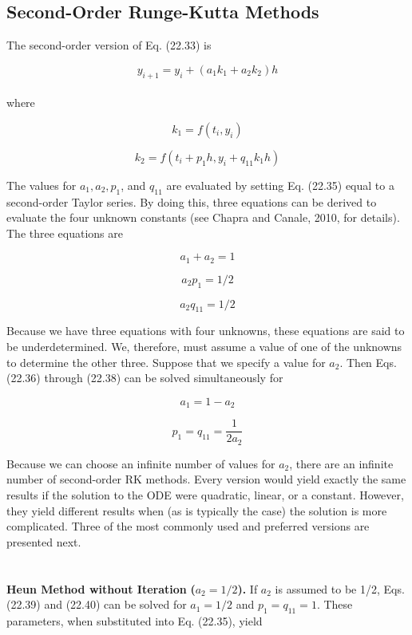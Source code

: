 \documentclass[../main.tex]{subfiles}
\begin{document}
\subsection{Second-Order Runge-Kutta Methods}

The second-order version of Eq. (22.33) is

\begin{equation}
\tag{22.35}
y_{i+1} = y_{i} + (a_1 k_1 + a_2k_2)h
\end{equation}\\
where

\begin{equation}
\tag{22.35a}
k_1 = f(t_{i}, y_{i})
\end{equation}

\begin{equation}
\tag{22.35b}
k_2 = f(t_{i} + p_1 h, y_{i} + q_{11} k_1 h )
\end{equation}

The values for $a_{1},a_{2},p_{1}$, and $q_{11}$ are evaluated by setting Eq. (22.35) equal to a
second-order Taylor series. By doing this, three equations can be derived to evaluate the
four unknown constants (see Chapra and Canale, 2010, for details). The three equations are

\begin{equation}
\tag{22.36}
a_{1} + a_{2} = 1
\end{equation}

\begin{equation}
\tag{22.37}
a_{2}p_{1} = 1/2
\end{equation}

\begin{equation}
\tag{22.38}
a_{2}q_{11} = 1/2
\end{equation}

Because we have three equations with four unknowns, these equations are said to be
underdetermined. We, therefore, must assume a value of one of the unknowns to determine
the other three. Suppose that we specify a value for $a_{2}$. Then Eqs. (22.36) through (22.38)
can be solved simultaneously for

\begin{equation}
\tag{22.39}
a_{1} = 1 - a_{2}
\end{equation}

\begin{equation}
\tag{22.40}
p_{1} = q_{11} = \dfrac{1}{2a_{2}}
\end{equation}

Because we can choose an infinite number of values for $a_{2}$, there are an infinite number of second-order RK methods. Every version would yield exactly the same results if the
solution to the ODE were quadratic, linear, or a constant. However, they yield different results when (as is typically the case) the solution is more complicated. Three of the most
commonly used and preferred versions are presented next.\\
\\
\\
\textbf{Heun Method without Iteration} \textbf{($a_{2} = 1/2$).} If $a_{2}$ is assumed to be 1/2, Eqs. (22.39)
and (22.40) can be solved for $a_{1} = 1/2$ and $p_{1} = q_{11} = 1$. These parameters, when substituted into Eq. (22.35), yield
\end{document}
